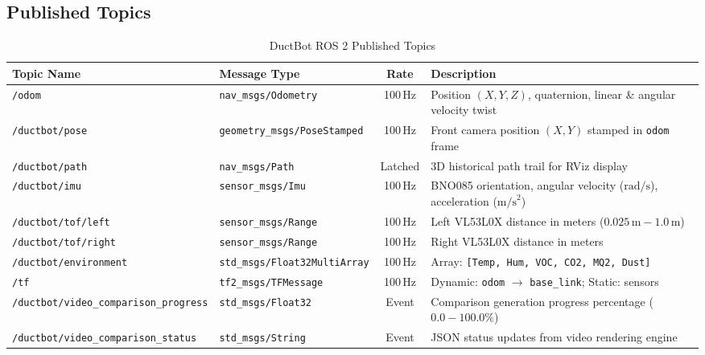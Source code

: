 \documentclass[11pt,a4paper]{article}
\begin{document}
\subsection{Published Topics}
\begin{table}[h!]
\centering
\small
\begin{tabularx}{\textwidth}{l l c X}
\toprule
\textbf{Topic Name} & \textbf{Message Type} & \textbf{Rate} & \textbf{Description} \\
\midrule
\texttt{/odom} & \texttt{nav\_msgs/Odometry} & 100\,Hz & Position $(X,Y,Z)$, quaternion, linear \& angular velocity twist \\
\texttt{/ductbot/pose} & \texttt{geometry\_msgs/PoseStamped} & 100\,Hz & Front camera position $(X,Y)$ stamped in \texttt{odom} frame \\
\texttt{/ductbot/path} & \texttt{nav\_msgs/Path} & Latched & 3D historical path trail for RViz display \\
\texttt{/ductbot/imu} & \texttt{sensor\_msgs/Imu} & 100\,Hz & BNO085 orientation, angular velocity ($\text{rad/s}$), acceleration ($\text{m/s}^2$) \\
\texttt{/ductbot/tof/left} & \texttt{sensor\_msgs/Range} & 100\,Hz & Left VL53L0X distance in meters ($0.025\,\text{m} - 1.0\,\text{m}$) \\
\texttt{/ductbot/tof/right} & \texttt{sensor\_msgs/Range} & 100\,Hz & Right VL53L0X distance in meters \\
\texttt{/ductbot/environment} & \texttt{std\_msgs/Float32MultiArray} & 100\,Hz & Array: \texttt{[Temp, Hum, VOC, CO2, MQ2, Dust]} \\
\texttt{/tf} & \texttt{tf2\_msgs/TFMessage} & 100\,Hz & Dynamic: \texttt{odom} $\to$ \texttt{base\_link}; Static: sensors \\
\texttt{/ductbot/video\_comparison\_progress} & \texttt{std\_msgs/Float32} & Event & Comparison generation progress percentage ($0.0 - 100.0\%$) \\
\texttt{/ductbot/video\_comparison\_status} & \texttt{std\_msgs/String} & Event & JSON status updates from video rendering engine \\
\bottomrule
\end{tabularx}
\caption{DuctBot ROS 2 Published Topics}
\end{table}
\end{document}
